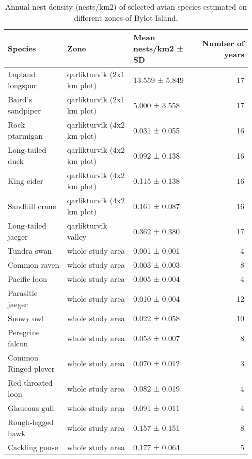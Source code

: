 \begin{table}[ht]
\centering
\caption{Annual nest density (nests/km2) of selected avian species estimated on different zones of Bylot Island.} 
\label{table:table_interannual_nest_density_variation}
\begingroup\fontsize{10pt}{10pt}\selectfont
\begin{tabularx}{0.95\textwidth}{lllr}
  \hline
Species & Zone & Mean nests/km2 ± SD & Number of years \\ 
  \hline
Lapland longspur & qarlikturvik (2x1 km plot) & 13.559 ± 5.849 &  17 \\ 
  Baird's sandpiper & qarlikturvik (2x1 km plot) & 5.000 ± 3.558 &  17 \\ 
  Rock ptarmigan & qarlikturvik (4x2 km plot) & 0.031 ± 0.055 &  16 \\ 
  Long-tailed duck & qarlikturvik (4x2 km plot) & 0.092 ± 0.138 &  16 \\ 
  King eider & qarlikturvik (4x2 km plot) & 0.115 ± 0.138 &  16 \\ 
  Sandhill crane & qarlikturvik (4x2 km plot) & 0.161 ± 0.087 &  16 \\ 
  Long-tailed jaeger & qarlikturvik valley & 0.362 ± 0.380 &  17 \\ 
  Tundra swan & whole study area & 0.001 ± 0.001 &   4 \\ 
  Common raven & whole study area & 0.003 ± 0.003 &   8 \\ 
  Pacific loon & whole study area & 0.005 ± 0.004 &   4 \\ 
  Parasitic jaeger & whole study area & 0.010 ± 0.004 &  12 \\ 
  Snowy owl & whole study area & 0.022 ± 0.058 &  10 \\ 
  Peregrine falcon & whole study area & 0.053 ± 0.007 &   8 \\ 
  Common Ringed plover & whole study area & 0.070 ± 0.012 &   3 \\ 
  Red-throated loon & whole study area & 0.082 ± 0.019 &   4 \\ 
  Glaucous gull & whole study area & 0.091 ± 0.011 &   4 \\ 
  Rough-legged hawk & whole study area & 0.157 ± 0.151 &   8 \\ 
  Cackling goose & whole study area & 0.177 ± 0.064 &   5 \\ 
   \hline
\end{tabularx}
\endgroup
\end{table}
